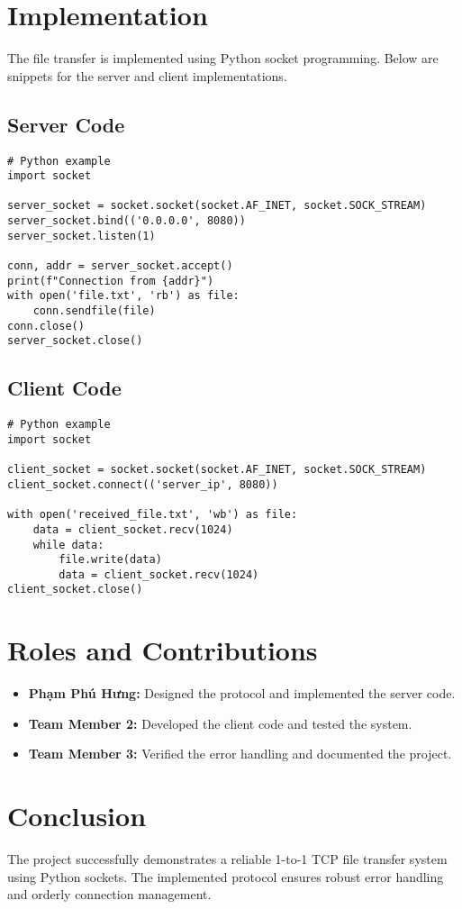 \documentclass[a4paper,12pt]{article}
\begin{document}
\section*{Implementation}
The file transfer is implemented using Python socket programming. Below are snippets for the server and client implementations.

\subsection*{Server Code}
\begin{verbatim}
# Python example
import socket

server_socket = socket.socket(socket.AF_INET, socket.SOCK_STREAM)
server_socket.bind(('0.0.0.0', 8080))
server_socket.listen(1)

conn, addr = server_socket.accept()
print(f"Connection from {addr}")
with open('file.txt', 'rb') as file:
    conn.sendfile(file)
conn.close()
server_socket.close()
\end{verbatim}

\subsection*{Client Code}
\begin{verbatim}
# Python example
import socket

client_socket = socket.socket(socket.AF_INET, socket.SOCK_STREAM)
client_socket.connect(('server_ip', 8080))

with open('received_file.txt', 'wb') as file:
    data = client_socket.recv(1024)
    while data:
        file.write(data)
        data = client_socket.recv(1024)
client_socket.close()
\end{verbatim}

\section*{Roles and Contributions}
\begin{itemize}
    \item \textbf{Phạm Phú Hưng:} Designed the protocol and implemented the server code.
    \item \textbf{Team Member 2:} Developed the client code and tested the system.
    \item \textbf{Team Member 3:} Verified the error handling and documented the project.
\end{itemize}

\section*{Conclusion}
The project successfully demonstrates a reliable 1-to-1 TCP file transfer system using Python sockets. The implemented protocol ensures robust error handling and orderly connection management.
\end{document}
